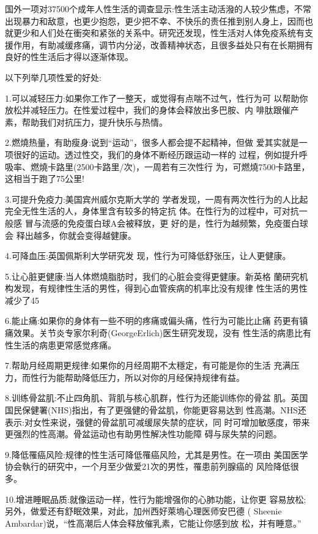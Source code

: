 \documentclass[12pt,UTF8]{ctexbook}
\begin{document}
国外一项对37500个成年人性生活的调查显示:性生活主动活潑的人较少焦虑，不常出现暴力和敌意，也更少抱怨，更少把不幸、不快乐的责任推到别人身上，因而也就更少和人们处在衝突和紧张的关系中。研究还发现，性生活对人体免疫系统有支援作用，有助减缓疼痛，调节内分泌，改善精神状态，且很多益处只有在长期拥有良好的性生活后才得以逐渐体现。

以下列举几项性爱的好处:

1.可以减轻压力:如果你工作了一整天，或觉得有点喘不过气，性行为可
以帮助你放松并减轻压力。在性爱过程中，我们的身体会释放出多巴胺、内
啡肽跟催产素，帮助我们对抗压力，提升快乐与热情。

2.燃燒热量，有助瘦身:说到“运动”，很多人都会提不起精神，但做
爱其实就是一项很好的运动。透过性交，我们的身体不断经历跟运动一样的
过程，例如提升呼吸率、燃燒卡路里(2500卡路里/次)，一周若有三次性行
为，可燃燒7500卡路里，这相当于跑了75公里!

3.可提升免疫力:美国宾州威尔克斯大学的
学者发现，一周有两次性行为的人比起完全无性生活的人，身体里含有较多的特定抗
体。在性行为的过程中，可对抗一般感
冒与流感的免疫蛋白球A会被释放，更
好的是，性行为越频繁，免疫蛋白球会
释出越多，你就会变得越健康。

4.可降血压:英国佩斯利大学研究发
现，性行为可降低舒张压，让人更健康。

5.让心脏更健康:当人体燃燒脂肪时，我们的心脏会变得更健康。新英格
蘭研究机构发现，有规律性生活的男性，得到心血管疾病的机率比没有规律
性生活的男性减少了45%

6.能止痛:如果你的身体有一些不明的疼痛或偏头痛，性行为可能比止痛
药更有镇痛效果。关节炎专家尔利奇(GeorgeErlich)医生研究发现，没有
性生活的病患比有性生活的病患更常感觉疼痛。

7.帮助月经周期更规律:如果你的月经周期不太穩定，有可能是你的生活
充满压力，而性行为能帮助降低压力，所以对你的月经保持规律有益。

8.训练骨盆肌:不止四角肌、背肌与核心肌群，性行为还能训练你的骨盆
肌。英国国民保健署(NHS)指出，有了更强健的骨盆肌，你能更容易达到
性高潮。NHS还表示:对女性来说，强健的骨盆肌可减缓尿失禁的症状，同
时可增加敏感度，带来更强烈的性高潮。骨盆运动也有助男性解决性功能障
碍与尿失禁的问题。

9.降低罹癌风险:规律的性生活可降低罹癌风险，尤其是男性。在一项由
美国医学协会執行的研究中，一个月至少做爱21次的男性，罹患前列腺癌的
风险降低很多。

10.增进睡眠品质:就像运动一样，性行为能增强你的心肺功能，让你更
容易放松;另外，做爱还有舒眠效果，对此，加州西好萊塢心理医师安巴德
( Sheenie Ambardar)说，“性高潮后人体会释放催乳素，它能让你感到放
松，并有睡意。”
\end{document}

